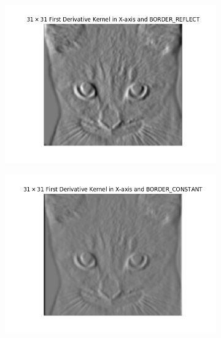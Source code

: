 \documentclass[11pt,a4paper]{article}
\begin{document}
\begin{figure}[H]
\begin{subfigure}{.5\textwidth}
	\centering
	\includegraphics[scale=0.44]{img/der-border1.png}
	\label{fig:der-border1}
\end{subfigure}
\begin{subfigure}{.5\textwidth}
	\centering
	\includegraphics[scale=0.44]{img/der-border2.png}
	\label{fig:der-border2}
\end{subfigure}
\begin{subfigure}{\textwidth}
	\centering

\end{subfigure}
\end{figure}
\end{document}
